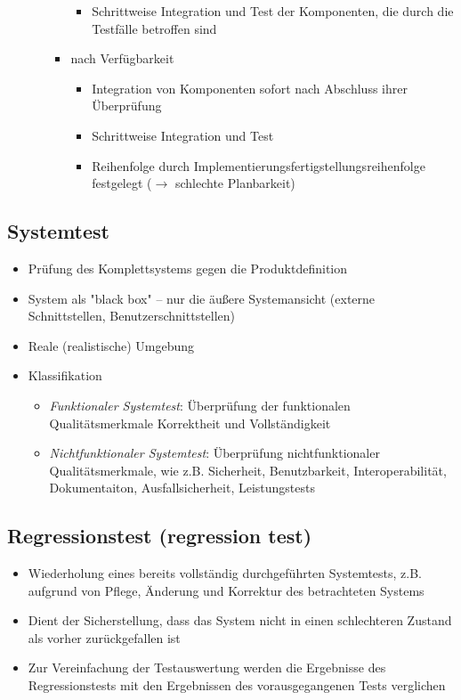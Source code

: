 \documentclass{article}
\begin{document}
\begin{itemize}
\begin{itemize}
\begin{itemize}
\begin{itemize}
        \item Schrittweise Integration und Test der Komponenten, die durch die Testfälle betroffen sind
      \end{itemize}
      \item nach Verfügbarkeit
      \begin{itemize}
        \item Integration von Komponenten sofort nach Abschluss ihrer Überprüfung
        \item Schrittweise Integration und Test
        \item Reihenfolge durch Implementierungsfertigstellungsreihenfolge festgelegt ($\to$ schlechte Planbarkeit)
      \end{itemize}
    \end{itemize}
  \end{itemize}
\end{itemize}

\subsection{Systemtest}
\begin{itemize}
  \item Prüfung des Komplettsystems gegen die Produktdefinition
  \item System als "black box" -- nur die äußere Systemansicht (externe Schnittstellen, Benutzerschnittstellen)
  \item Reale (realistische) Umgebung
  \item Klassifikation
  \begin{itemize}
    \item \textit{Funktionaler Systemtest}: Überprüfung der funktionalen Qualitätsmerkmale Korrektheit und Vollständigkeit
    \item \textit{Nichtfunktionaler Systemtest}: Überprüfung nichtfunktionaler Qualitätsmerkmale, wie z.B. Sicherheit, Benutzbarkeit, Interoperabilität, Dokumentaiton, Ausfallsicherheit, Leistungstests
  \end{itemize}
\end{itemize}

\subsection{Regressionstest (regression test)}
\begin{itemize}
  \item Wiederholung eines bereits vollständig durchgeführten Systemtests, z.B. aufgrund von Pflege, Änderung und Korrektur des betrachteten Systems
  \item Dient der Sicherstellung, dass das System nicht in einen schlechteren Zustand als vorher zurückgefallen ist
  \item Zur Vereinfachung der Testauswertung werden die Ergebnisse des Regressionstests mit den Ergebnissen des vorausgegangenen Tests verglichen
\end{itemize}
\end{document}
